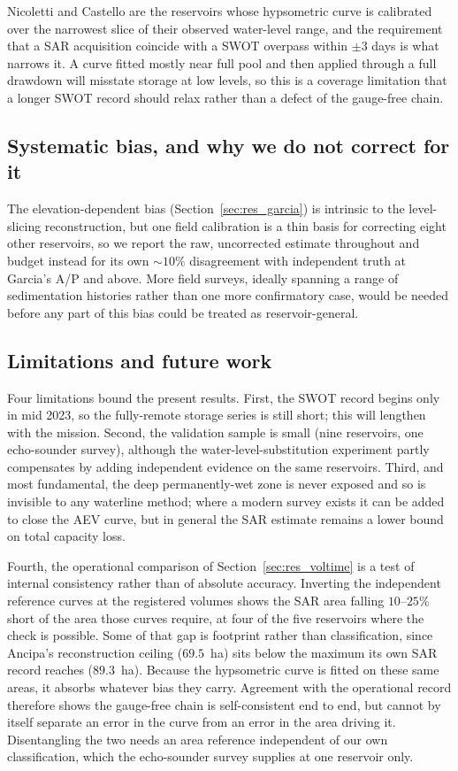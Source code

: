 Nicoletti and Castello are the reservoirs whose hypsometric curve is calibrated over the
narrowest slice of their observed water-level range, and the requirement that a SAR
acquisition coincide with a SWOT overpass within $\pm3$ days is what narrows it. A curve
fitted mostly near full pool and then applied through a full drawdown will misstate
storage at low levels, so this is a coverage limitation that a longer SWOT record should
relax rather than a defect of the gauge-free chain.

\subsection{Systematic bias, and why we do not correct for it}
The elevation-dependent bias (Section~\ref{sec:res_garcia}) is intrinsic to the
level-slicing reconstruction, but one field calibration is a thin basis for correcting
eight other reservoirs, so we report the raw, uncorrected estimate throughout and
budget instead for its own ${\sim}10\%$ disagreement with independent truth at Garcia's
A/P and above. More field surveys, ideally spanning a range of sedimentation histories
rather than one more confirmatory case, would be needed before any part of this bias
could be treated as reservoir-general.

\subsection{Limitations and future work}
Four limitations bound the present results. First, the SWOT record begins only in mid
2023, so the fully-remote storage series is still short; this will lengthen with the
mission. Second, the validation sample is small (nine reservoirs, one echo-sounder
survey), although the water-level-substitution experiment partly compensates by adding
independent evidence on the same reservoirs. Third, and most fundamental, the deep
permanently-wet zone is never exposed and so is invisible to any waterline method; where a
modern survey exists it can be added to close the AEV curve, but in general the SAR
estimate remains a lower bound on total capacity loss.

Fourth, the operational comparison of Section~\ref{sec:res_voltime} is a test of internal
consistency rather than of absolute accuracy. Inverting the independent reference curves at
the registered volumes shows the SAR area falling $10$--$25\%$ short of the area those
curves require, at four of the five reservoirs where the check is possible. Some of that
gap is footprint rather than classification, since Ancipa's reconstruction ceiling
($69.5$~ha) sits below the maximum its own SAR record reaches ($89.3$~ha). Because the
hypsometric curve is fitted on these same areas, it absorbs whatever bias they carry.
Agreement with the operational record therefore shows the gauge-free chain is self-consistent
end to end, but cannot by itself separate an error in the curve from an error in the area
driving it. Disentangling the two needs an area reference independent of our own
classification, which the echo-sounder survey supplies at one reservoir only.

